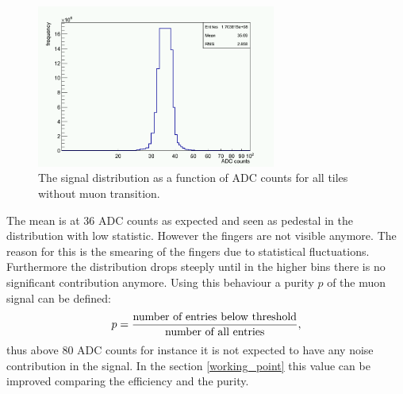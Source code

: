 			\begin{figure}[htbp]
				\centering
				\includegraphics[width=0.70\textwidth]{Figures/erdogan/noise_high.png}
				\caption{The signal distribution as a function of ADC counts for all tiles without muon transition.}
				\label{fig:noise_high}
			\end{figure}
			The mean is at 36 ADC counts as expected and seen as pedestal in the distribution with low statistic.
			However the fingers are not visible anymore.
			The reason for this is the smearing of the fingers due to statistical fluctuations.
			Furthermore the distribution drops steeply until in the higher bins there is no significant contribution anymore.
			Using this behaviour a purity $p$ of the muon signal can be defined:
			\begin{equation}
				p = \frac{\textnormal{number of entries below threshold}}{\textnormal{number of all entries}},
			\end{equation}
			thus above 80 ADC counts for instance it is not expected to have any noise contribution in the signal.
			In the section \ref{working_point} this value can be improved comparing the efficiency and the purity.
